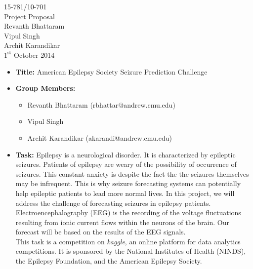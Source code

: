\documentclass[11pt]{article}
\begin{document}
\medskip                        %

\thispagestyle{plain}
\begin{center}                  %
{\Large 15-781/10-701} \\
{\Large Project Proposal} \\
Revanth Bhattaram\\
Vipul Singh \\
Archit Karandikar \\
$1^\text{st}$ October 2014 \\
\end{center}

\begin{itemize}

\item
\textbf{Title:} American Epilepsy Society Seizure Prediction Challenge

\item
\textbf{Group Members:}
\begin{itemize}
\item Revanth Bhattaram (rbhattar@andrew.cmu.edu)
\item Vipul Singh
\item Archit Karandikar (akarandi@andrew.cmu.edu)
\end{itemize}

\item
\textbf{Task:} Epilepsy is a neurological disorder. It is characterized by epileptic seizures. Patients of epilepsy are weary of the possibility of occurrence of seizures. This constant anxiety is despite the fact the the seizures themselves may be infrequent. This is why seizure forecasting systems can potentially help epileptic patients to lead more normal lives. In this project, we will address the challenge of forecasting seizures in epilepsy patients. \\
\-\hspace{7pt} Electroencephalography (EEG) is the recording of the voltage fluctuations resulting from ionic current flows within the neurons of the brain. Our forecast will be based on the results of the EEG signals. \\
\-\hspace{7pt} This task is a competition on \textit{kaggle}, an online platform for data analytics competitions. It is sponsored by the National Institutes of Health (NINDS), the Epilepsy Foundation, and the American Epilepsy Society.


\end{itemize}
\end{document}
